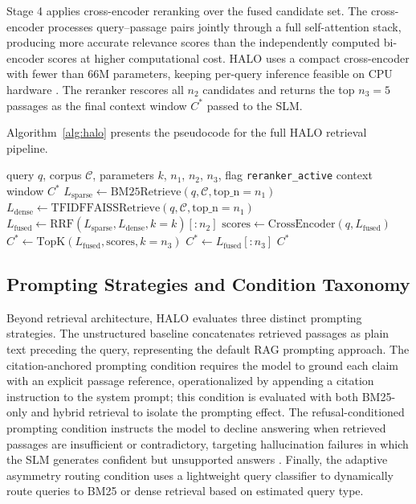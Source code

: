 \documentclass{article}
\begin{document}
Stage 4 applies cross-encoder reranking over the fused candidate set. The cross-encoder processes query--passage pairs jointly through a full self-attention stack, producing more accurate relevance scores than the independently computed bi-encoder scores at higher computational cost. HALO uses a compact cross-encoder with fewer than 66M parameters, keeping per-query inference feasible on CPU hardware \cite{nogueira2019passage}. The reranker rescores all $n_2$ candidates and returns the top $n_3 = 5$ passages as the final context window $C^*$ passed to the SLM.

Algorithm~\ref{alg:halo} presents the pseudocode for the full HALO retrieval pipeline.

\begin{algorithm}[t]
\caption{HALO Retrieval Pipeline}
\label{alg:halo}
\begin{algorithmic}[1]
\REQUIRE query $q$, corpus $\mathcal{C}$, parameters $k$, $n_1$, $n_2$, $n_3$, flag \texttt{reranker\_active}
\ENSURE context window $C^*$
\STATE $L_{\text{sparse}} \leftarrow \text{BM25Retrieve}(q, \mathcal{C}, \text{top\_n}=n_1)$ 
\STATE $L_{\text{dense}}  \leftarrow \text{TFIDFFAISSRetrieve}(q, \mathcal{C}, \text{top\_n}=n_1)$ 
\STATE $L_{\text{fused}}  \leftarrow \text{RRF}(L_{\text{sparse}}, L_{\text{dense}}, k=k)[:n_2]$ 
  \STATE $\text{scores} \leftarrow \text{CrossEncoder}(q, L_{\text{fused}})$ 
  \STATE $C^* \leftarrow \text{TopK}(L_{\text{fused}}, \text{scores}, k=n_3)$
\ELSE
  \STATE $C^* \leftarrow L_{\text{fused}}[:n_3]$
\ENDIF
\RETURN $C^*$
\end{algorithmic}
\end{algorithm}

\subsection{Prompting Strategies and Condition Taxonomy}

\label{sec:prompting_strategies_and_condition_taxon}

Beyond retrieval architecture, HALO evaluates three distinct prompting strategies. The unstructured baseline concatenates retrieved passages as plain text preceding the query, representing the default RAG prompting approach. The citation-anchored prompting condition requires the model to ground each claim with an explicit passage reference, operationalized by appending a citation instruction to the system prompt; this condition is evaluated with both BM25-only and hybrid retrieval to isolate the prompting effect. The refusal-conditioned prompting condition instructs the model to decline answering when retrieved passages are insufficient or contradictory, targeting hallucination failures in which the SLM generates confident but unsupported answers \cite{liu2022pretrain}. Finally, the adaptive asymmetry routing condition uses a lightweight query classifier to dynamically route queries to BM25 or dense retrieval based on estimated query type.
\end{document}
